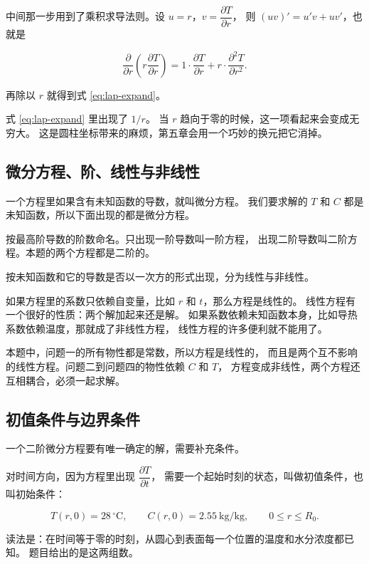 中间那一步用到了乘积求导法则。设 $u=r$，$v=\dfrac{\partial T}{\partial r}$，
则 $(uv)' = u'v + uv'$，也就是

\begin{equation}
\frac{\partial}{\partial r}\left(r\frac{\partial T}{\partial r}\right)
= 1\cdot\frac{\partial T}{\partial r} + r\cdot\frac{\partial^2 T}{\partial r^2}.
\end{equation}

再除以 $r$ 就得到式 \eqref{eq:lap-expand}。

\keypoint
式 \eqref{eq:lap-expand} 里出现了 $1/r$。
当 $r$ 趋向于零的时候，这一项看起来会变成无穷大。
这是圆柱坐标带来的麻烦，第五章会用一个巧妙的换元把它消掉。

\subsection{微分方程、阶、线性与非线性}

一个方程里如果含有未知函数的导数，就叫微分方程。
我们要求解的 $T$ 和 $C$ 都是未知函数，所以下面出现的都是微分方程。

按最高阶导数的阶数命名。只出现一阶导数叫一阶方程，
出现二阶导数叫二阶方程。本题的两个方程都是二阶的。

按未知函数和它的导数是否以一次方的形式出现，分为线性与非线性。

如果方程里的系数只依赖自变量，比如 $r$ 和 $t$，那么方程是线性的。
线性方程有一个很好的性质：两个解加起来还是解。
如果系数依赖未知函数本身，比如导热系数依赖温度，那就成了非线性方程，
线性方程的许多便利就不能用了。

本题中，问题一的所有物性都是常数，所以方程是线性的，
而且是两个互不影响的线性方程。问题二到问题四的物性依赖 $C$ 和 $T$，
方程变成非线性，两个方程还互相耦合，必须一起求解。

\subsection{初值条件与边界条件}

一个二阶微分方程要有唯一确定的解，需要补充条件。

对时间方向，因为方程里出现 $\dfrac{\partial T}{\partial t}$，
需要一个起始时刻的状态，叫做初值条件，也叫初始条件：

\begin{equation}
T(r,0)=28\,^\circ\mathrm{C}, \qquad C(r,0)=2.55\ \mathrm{kg/kg},
\qquad 0\le r\le R_0 .
\end{equation}

读法是：在时间等于零的时刻，从圆心到表面每一个位置的温度和水分浓度都已知。
题目给出的是这两组数。


